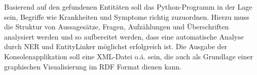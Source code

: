 Basierend auf den gefundenen Entitäten soll das Python-Programm in der Lage sein, Begriffe wie Krankheiten und Symptome richtig zuzuordnen. Hierzu muss die Struktur von Aussagesätze, Fragen, Aufzählungen und Überschriften analysiert werden und so aufbereitet werden, dass eine automatische Analyse durch NER und EntityLinker möglichst erfolgreich ist. Die Ausgabe der Konsolenapplikation soll eine XML-Datei o.ä. sein, die auch als Grundlage einer graphischen Visualisierung im RDF Format dienen kann.

